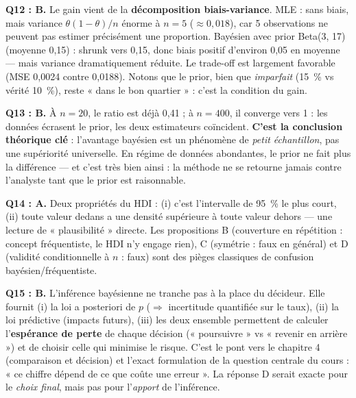 \documentclass[11pt,a4paper]{article}
\begin{document}
\begin{corrigebox}
\textbf{Q12 : B.} Le gain vient de la \textbf{décomposition biais-variance}.
MLE : sans biais, mais variance $\theta(1-\theta)/n$ énorme à $n = 5$
($\approx 0{,}018$), car 5 observations ne peuvent pas estimer précisément
une proportion. Bayésien avec prior Beta(3, 17) (moyenne 0,15) : shrunk vers
0,15, donc biais positif d'environ 0,05 en moyenne --- mais variance
dramatiquement réduite. Le trade-off est largement favorable (MSE 0,0024
contre 0,0188). Notons que le prior, bien que \emph{imparfait} (15~\% vs
vérité 10~\%), reste « dans le bon quartier » : c'est la condition du gain.

\textbf{Q13 : B.} À $n = 20$, le ratio est déjà 0,41 ; à $n = 400$, il
converge vers 1 : les données écrasent le prior, les deux estimateurs
coïncident. \textbf{C'est la conclusion théorique clé} : l'avantage bayésien
est un phénomène de \emph{petit échantillon}, pas une supériorité universelle.
En régime de données abondantes, le prior ne fait plus la différence ---
et c'est très bien ainsi : la méthode ne se retourne jamais contre l'analyste
tant que le prior est raisonnable.

\textbf{Q14 : A.} Deux propriétés du HDI : (i) c'est l'intervalle de 95~\% le
plus court, (ii) toute valeur dedans a une densité supérieure à toute valeur
dehors --- une lecture de « plausibilité » directe. Les propositions B
(couverture en répétition : concept fréquentiste, le HDI n'y engage rien),
C (symétrie : faux en général) et D (validité conditionnelle à $n$ : faux) sont
des pièges classiques de confusion bayésien/fréquentiste.

\textbf{Q15 : B.} L'inférence bayésienne ne tranche pas à la place du décideur.
Elle fournit (i) la loi a posteriori de $p$ ($\Rightarrow$ incertitude
quantifiée sur le taux), (ii) la loi prédictive (impacts futurs), (iii) les
deux ensemble permettent de calculer l'\textbf{espérance de perte} de chaque
décision (« poursuivre » vs « revenir en arrière ») et de choisir celle qui
minimise le risque. C'est le pont vers le chapitre 4 (comparaison et décision)
et l'exact formulation de la question centrale du cours : « ce chiffre dépend
de ce que coûte une erreur ». La réponse D serait exacte pour le \emph{choix
final}, mais pas pour l'\emph{apport} de l'inférence.
\end{corrigebox}

\end{document}
